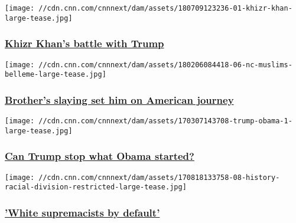 \href{/2018/07/20/us/khizr-khan-the-making-of-an-activist/index.html}{}

\texttt{[image: //cdn.cnn.com/cnnnext/dam/assets/180709123236-01-khizr-khan-large-tease.jpg]}

\hypertarget{khizr-khans-battle-with-trump}{%
\subsubsection{\texorpdfstring{\href{/2018/07/20/us/khizr-khan-the-making-of-an-activist/index.html}{Khizr
Khan's battle with
Trump}}{Khizr Khan's battle with Trump}}\label{khizr-khans-battle-with-trump}}

\href{/2018/02/08/us/nc-muslim-killings-american-journey/index.html}{}

\texttt{[image: //cdn.cnn.com/cnnnext/dam/assets/180206084418-06-nc-muslims-belleme-large-tease.jpg]}

\hypertarget{brothers-slaying-set-him-on-american-journey}{%
\subsubsection{\texorpdfstring{\href{/2018/02/08/us/nc-muslim-killings-american-journey/index.html}{Brother's
slaying set him on American
journey}}{Brother's slaying set him on American journey}}\label{brothers-slaying-set-him-on-american-journey}}

\href{/2018/08/09/us/obama-ten-years-later/index.html}{}

\texttt{[image: //cdn.cnn.com/cnnnext/dam/assets/170307143708-trump-obama-1-large-tease.jpg]}

\hypertarget{can-trump-stop-what-obama-started}{%
\subsubsection{\texorpdfstring{\href{/2018/08/09/us/obama-ten-years-later/index.html}{Can
Trump stop what Obama
started?}}{Can Trump stop what Obama started?}}\label{can-trump-stop-what-obama-started}}

\href{/2017/08/18/us/ordinary-white-supremacists/index.html}{}

\texttt{[image: //cdn.cnn.com/cnnnext/dam/assets/170818133758-08-history-racial-division-restricted-large-tease.jpg]}

\hypertarget{white-supremacists-by-default}{%
\subsubsection{\texorpdfstring{\href{/2017/08/18/us/ordinary-white-supremacists/index.html}{'White
supremacists by
default'}}{'White supremacists by default'}}\label{white-supremacists-by-default}}

